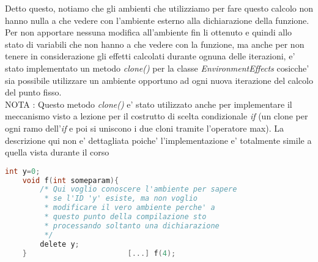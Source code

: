 \documentclass{article}
\begin{document}
\begin{itemize}
    Detto questo, notiamo che gli ambienti che utilizziamo per fare questo calcolo non hanno nulla a che vedere con l'ambiente esterno alla dichiarazione della funzione. Per non apportare nessuna modifica all'ambiente fin li ottenuto e quindi allo stato di variabili che non hanno a che vedere con la funzione, ma anche per non tenere in considerazione gli effetti calcolati durante ognuna delle iterazioni, e' stato implementato un metodo \textit{clone()} per la classe \textit{EnvironmentEffects} cosicche' sia possibile utilizzare un ambiente opportuno ad ogni nuova iterazione del calcolo del punto fisso.\\
    NOTA : Questo metodo \textit{clone()} e' stato utilizzato anche per implementare il meccanismo visto a lezione per il costrutto di scelta condizionale \textit{if} (un clone per ogni ramo dell'\textit{if} e poi si uniscono i due cloni tramite l'operatore max). La descrizione qui non e' dettagliata poiche' l'implementazione e' totalmente simile a quella vista durante il corso
    \begin{lstlisting}[language=c]
    int y=0;
    void f(int someparam){
        /* Qui voglio conoscere l'ambiente per sapere
         * se l'ID 'y' esiste, ma non voglio
         * modificare il vero ambiente perche' a 
         * questo punto della compilazione sto 
         * processando soltanto una dichiarazione
         */
        delete y;
    }                       [...] f(4);
    
    \end{lstlisting}
\end{itemize}
\end{document}
